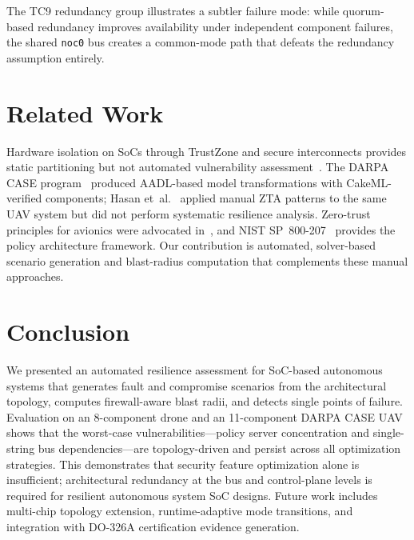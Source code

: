 \documentclass[conference]{IEEEtran}
\begin{document}
The TC9 redundancy group illustrates a subtler failure mode: while
quorum-based redundancy improves availability under independent component
failures, the shared \texttt{noc0} bus creates a common-mode path that
defeats the redundancy assumption entirely.

\section{Related Work}

Hardware isolation on SoCs through TrustZone and secure interconnects
provides static partitioning but not automated vulnerability
assessment~\cite{fiorin_noc}. The DARPA CASE program~\cite{darpa_case}
produced AADL-based model transformations with CakeML-verified
components; Hasan et~al.~\cite{hasan_saecps} applied manual ZTA patterns
to the same UAV system but did not perform systematic resilience
analysis. Zero-trust principles for avionics were advocated
in~\cite{ztas_dasc}, and NIST SP~800-207~\cite{nist_zta} provides the
policy architecture framework. Our contribution is automated,
solver-based scenario generation and blast-radius computation that
complements these manual approaches.

\section{Conclusion}

We presented an automated resilience assessment for SoC-based autonomous
systems that generates fault and compromise scenarios from the
architectural topology, computes firewall-aware blast radii, and detects
single points of failure. Evaluation on an 8-component drone and an
11-component DARPA CASE UAV shows that the worst-case
vulnerabilities---policy server concentration and single-string bus
dependencies---are topology-driven and persist across all optimization
strategies. This demonstrates that security feature optimization alone is
insufficient; architectural redundancy at the bus and control-plane
levels is required for resilient autonomous system SoC designs. Future
work includes multi-chip topology extension, runtime-adaptive mode
transitions, and integration with DO-326A certification evidence
generation.

\balance


\end{document}

